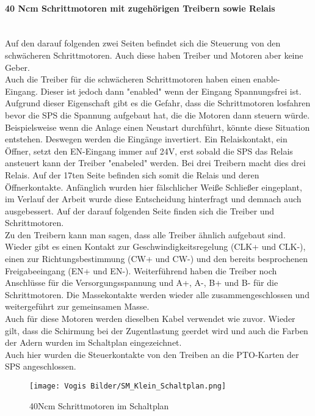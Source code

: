     \paragraph{40 Ncm Schrittmotoren mit zugehörigen Treibern sowie Relais}\mbox{}\\
    Auf den darauf folgenden zwei Seiten befindet sich die Steuerung von den schwächeren Schrittmotoren. Auch diese haben Treiber und Motoren aber keine Geber.\\
    Auch die Treiber für die schwächeren Schrittmotoren haben einen enable-Eingang. Dieser ist jedoch dann "enabled" wenn der Eingang Spannungsfrei ist. Aufgrund dieser Eigenschaft gibt es die Gefahr, dass die Schrittmotoren losfahren bevor die SPS die Spannung aufgebaut hat, die die Motoren dann steuern würde. Beispielsweise wenn die Anlage einen Neustart durchführt, könnte diese Situation entstehen. Deswegen werden die Eingänge invertiert. Ein Relaiskontakt, ein Öffner, setzt den EN-Eingang immer auf 24V, erst sobald die SPS das Relais ansteuert kann der Treiber "enabeled" werden. Bei drei Treibern macht dies drei Relais. Auf der 17ten Seite befinden sich somit die Relais und deren Öffnerkontakte. Anfänglich wurden hier fälschlicher Weiße Schließer eingeplant, im Verlauf der Arbeit wurde diese Entscheidung hinterfragt und demnach auch ausgebessert. Auf der darauf folgenden Seite finden sich die Treiber und Schrittmotoren.\\
    Zu den Treibern kann man sagen, dass alle Treiber ähnlich aufgebaut sind. Wieder gibt es einen Kontakt zur Geschwindigkeitsregelung (CLK+ und CLK-), einen zur Richtungsbestimmung (CW+ und CW-) und den bereits besprochenen Freigabeeingang (EN+ und EN-). Weiterführend haben die Treiber noch Anschlüsse für die Versorgungsspannung und A+, A-, B+ und B- für die Schrittmotoren. Die Massekontakte werden wieder alle zusammengeschlossen und weitergeführt zur gemeinsamen Masse.\\ 
    Auch für diese Motoren werden dieselben Kabel verwendet wie zuvor. Wieder gilt, dass die Schirmung bei der Zugentlastung geerdet wird und auch die Farben der Adern wurden im Schaltplan eingezeichnet.\\
    Auch hier wurden die Steuerkontakte von den Treiben an die PTO-Karten der SPS angeschlossen.
    \begin{figure}[h]
        \centering
        \texttt{[image: Vogis Bilder/SM\_Klein\_Schaltplan.png]}
        \caption{40Ncm Schrittmotoren im Schaltplan}
        \label{fig:SMkleine}
    \end{figure}
